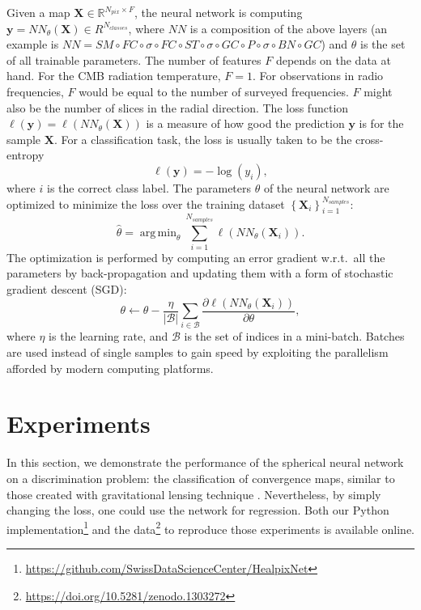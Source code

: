 \documentclass[final,twocolumn,3p,times,authoryear]{elsarticle}
\renewcommand{\b}[1]{{\bm{#1}}}   %
\newcommand{\1}{\b{1}}              %
\newcommand{\0}{\b{0}}              %
\newcommand{\B}{\mathcal{B}}
\newcommand{\X}{\b{X}}
\newcommand{\y}{\b{y}}
\newcommand{\R}{\mathbb{R}}
\DeclareMathOperator*{\argmin}{arg \, min}
\begin{document}
Given a map $\X \in \R^{N_{pix} \times F}$, the neural network is computing $\y = NN_\theta(\X) \in R^{N_{classes}}$, where $NN$ is a composition of the above layers (an example is $NN = SM \circ FC \circ \sigma \circ FC \circ ST \circ \sigma \circ GC \circ P \circ \sigma \circ BN \circ GC$) and $\theta$ is the set of all trainable parameters.
The number of features $F$ depends on the data at hand. For the CMB radiation temperature, $F = 1$. For observations in radio frequencies, $F$ would be equal to the number of surveyed frequencies. $F$ might also be the number of slices in the radial direction.
The loss function $\ell(\y) = \ell(NN_\theta(\X))$ is a measure of how good the prediction $\y$ is for the sample $\X$. For a classification task, the loss is usually taken to be the cross-entropy
\begin{equation*}
	\ell(\y) = -\log(y_i),
\end{equation*}
where $i$ is the correct class label.
The parameters $\theta$ of the neural network are optimized to minimize the loss over the training dataset $\left\{ \X_i \right\}_{i=1}^{N_{samples}}$:
\begin{equation*}
	\hat{\theta} = \argmin_\theta \sum_{i=1}^{N_{samples}} \ell(NN_\theta(\X_i)).
\end{equation*}
The optimization is performed by computing an error gradient w.r.t.\ all the parameters by back-propagation and updating them with a form of stochastic gradient descent (SGD):
\begin{equation*}
	\theta \leftarrow \theta - \frac{\eta}{|\B|} \sum_{i \in \B} \frac{\partial \ell(NN_\theta(\X_i))}{\partial \theta} ,
\end{equation*}
where $\eta$ is the learning rate, and $\B$ is the set of indices in a mini-batch. Batches are used instead of single samples to gain speed by exploiting the parallelism afforded by modern computing platforms.

\section{Experiments}
\label{sec:experiments}

In this section, we demonstrate the performance of the spherical neural network on a discrimination problem: the classification of convergence maps, similar to those created with gravitational lensing technique \citep{chang2017curvedsky}. Nevertheless, by simply changing the loss, one could use the network for regression.
Both our Python implementation\footnote{\url{https://github.com/SwissDataScienceCenter/HealpixNet}} and the data\footnote{\url{https://doi.org/10.5281/zenodo.1303272}} to reproduce those experiments is available online.
\end{document}
